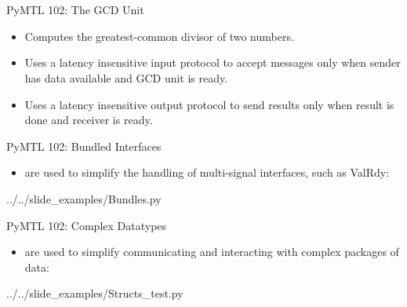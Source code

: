 
\section[{\it Hands-On} GCD Unit]{}

\begin{frame}{PyMTL 102: The GCD Unit}
\begin{itemize}
  \item Computes the greatest-common divisor of two numbers.
  \smallskip
  \item Uses a latency insensitive input protocol to accept messages only
        when sender has data available and GCD unit is ready.
  \smallskip
  \item Uses a latency insensitive output protocol to send results only
        when result is done and receiver is ready.
\end{itemize}

\end{frame}

\begin{frame}{PyMTL 102: Bundled Interfaces}
\vspace{-0.18in}
\begin{itemize}
  \item {} are used to simplify the handling of multi-signal
        interfaces, such as ValRdy:
\end{itemize}

\vspace{-0.15in}

{../../slide_examples/Bundles.py}

\end{frame}

\begin{frame}{PyMTL 102: Complex Datatypes}
\vspace{-0.18in}
\begin{itemize}
  \item {} are used to simplify communicating and interacting
        with complex packages of data:
\end{itemize}

\vspace{-0.15in}

{../../slide_examples/Structs_test.py}

\end{frame}

